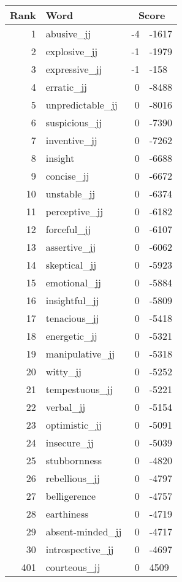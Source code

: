 \begin{longtable}[!htbp]{| rlr@{.}l |}
    \hline
    \textbf{Rank} & \textbf{Word} & \multicolumn{2}{c|}{\textbf{Score}} \\
    \hline
    \endhead
    1 & abusive\_jj & -4 & -1617 \\
    2 & explosive\_jj & -1 & -1979 \\
    3 & expressive\_jj & -1 & -158 \\
    4 & erratic\_jj & 0 & -8488 \\
    5 & unpredictable\_jj & 0 & -8016 \\
    6 & suspicious\_jj & 0 & -7390 \\
    7 & inventive\_jj & 0 & -7262 \\
    8 & insight & 0 & -6688 \\
    9 & concise\_jj & 0 & -6672 \\
    10 & unstable\_jj & 0 & -6374 \\
    11 & perceptive\_jj & 0 & -6182 \\
    12 & forceful\_jj & 0 & -6107 \\
    13 & assertive\_jj & 0 & -6062 \\
    14 & skeptical\_jj & 0 & -5923 \\
    15 & emotional\_jj & 0 & -5884 \\
    16 & insightful\_jj & 0 & -5809 \\
    17 & tenacious\_jj & 0 & -5418 \\
    18 & energetic\_jj & 0 & -5321 \\
    19 & manipulative\_jj & 0 & -5318 \\
    20 & witty\_jj & 0 & -5252 \\
    21 & tempestuous\_jj & 0 & -5221 \\
    22 & verbal\_jj & 0 & -5154 \\
    23 & optimistic\_jj & 0 & -5091 \\
    24 & insecure\_jj & 0 & -5039 \\
    25 & stubbornness & 0 & -4820 \\
    26 & rebellious\_jj & 0 & -4797 \\
    27 & belligerence & 0 & -4757 \\
    28 & earthiness & 0 & -4719 \\
    29 & absent-minded\_jj & 0 & -4717 \\
    30 & introspective\_jj & 0 & -4697 \\
    401 & courteous\_jj & 0 & 4509 \\

\end{longtable}
